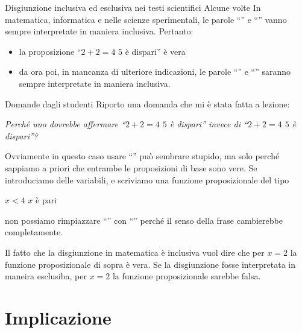 \documentclass[aspectratio=169,10pt,dvipsnames,handout]{beamer}
\begin{document}
\begin{frame}{Disgiunzione inclusiva ed esclusiva nei testi scientifici}
    Alcune volte
    In matematica, informatica e nelle scienze sperimentali, le parole ``'' e ``'' vanno sempre interpretate in maniera inclusiva. Pertanto:
    \begin{itemize}
        \item la proposizione ``$2 + 2 = 4$  $5$ è dispari'' è vera
        \item da ora poi, in mancanza di ulteriore indicazioni, le parole ``'' e ``'' saranno sempre interpretate in maniera inclusiva.
    \end{itemize}
\end{frame}

\begin{frame}{Domande dagli studenti}
    Riporto una domanda che mi è stata fatta a lezione:

    \medskip
    \textit{Perché uno dovrebbe affermare ``$2 + 2 = 4$  $5$ è dispari'' invece di ``$2 + 2 = 4$  $5$ è dispari''?}

    \medskip
    Ovviamente in questo caso usare ``'' può sembrare stupido, ma solo perché sappiamo a priori che entrambe le proposizioni di base sono vere. Se introduciamo delle variabili, e scriviamo una funzione proposizionale del tipo
    \begin{center}
    $x < 4$  $x$ è pari
    \end{center}
    non possiamo rimpiazzare ``'' con ``'' perché il senso della frase cambierebbe completamente.

    \smallskip
    Il fatto che la disgiunzione in matematica è inclusiva vuol dire che per $x=2$ la funzione proposizionale di sopra è vera. Se la disgiunzione fosse interpretata in maneira esclusiba, per $x=2$ la funzione proposizionale sarebbe falsa.
\end{frame}

\section{Implicazione}
\end{document}
